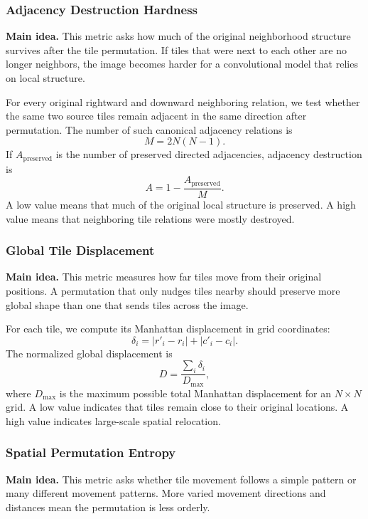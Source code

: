 \documentclass[12pt]{article}
\begin{document}
\subsubsection{Adjacency Destruction Hardness}

\textbf{Main idea.} This metric asks how much of the original neighborhood structure survives after the tile permutation. If tiles that were next to each other are no longer neighbors, the image becomes harder for a convolutional model that relies on local structure.

For every original rightward and downward neighboring relation, we test whether the same two source tiles remain adjacent in the same direction after permutation. The number of such canonical adjacency relations is
\[
M = 2N(N-1).
\]
If $A_{\mathrm{preserved}}$ is the number of preserved directed adjacencies, adjacency destruction is
\[
A = 1 - \frac{A_{\mathrm{preserved}}}{M}.
\]
A low value means that much of the original local structure is preserved. A high value means that neighboring tile relations were mostly destroyed.

\subsubsection{Global Tile Displacement}

\textbf{Main idea.} This metric measures how far tiles move from their original positions. A permutation that only nudges tiles nearby should preserve more global shape than one that sends tiles across the image.

For each tile, we compute its Manhattan displacement in grid coordinates:
\[
\delta_i = |r'_i-r_i| + |c'_i-c_i|.
\]
The normalized global displacement is
\[
D = \frac{\sum_i \delta_i}{D_{\max}},
\]
where $D_{\max}$ is the maximum possible total Manhattan displacement for an $N \times N$ grid. A low value indicates that tiles remain close to their original locations. A high value indicates large-scale spatial relocation.

\subsubsection{Spatial Permutation Entropy}

\textbf{Main idea.} This metric asks whether tile movement follows a simple pattern or many different movement patterns. More varied movement directions and distances mean the permutation is less orderly.
\end{document}
